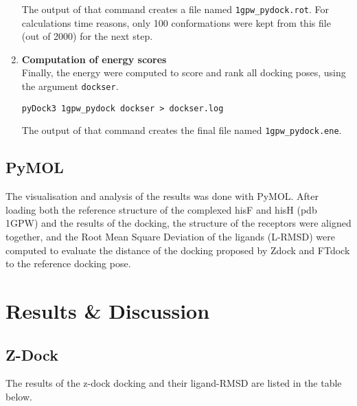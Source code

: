 \documentclass[11pt]{article}
\begin{document}
\begin{enumerate}
  The output of that command creates a file named
  \texttt{1gpw\_pydock.rot}. For calculations time reasons, only 100
  conformations were kept from this file (out of 2000) for the next
  step.\\
\item
  \textbf{Computation of energy scores}\\
  Finally, the energy were computed to score and rank all docking poses,
  using the argument \texttt{dockser}.

\begin{verbatim}
pyDock3 1gpw_pydock dockser > dockser.log
\end{verbatim}

  The output of that command creates the final file named
  \texttt{1gpw\_pydock.ene}.\\
\end{enumerate}

\subsection{PyMOL}\label{pymol}

The visualisation and analysis of the results was done with PyMOL. After
loading both the reference structure of the complexed hisF and hisH (pdb
1GPW) and the results of the docking, the structure of the receptors
were aligned together, and the Root Mean Square Deviation of the ligands
(L-RMSD) were computed to evaluate the distance of the docking proposed
by Zdock and FTdock to the reference docking pose.

    \section{Results \& Discussion}\label{results-discussion}

\subsection{Z-Dock}\label{z-dock}

The results of the z-dock docking and their ligand-RMSD are listed in
the table below.
\end{document}
